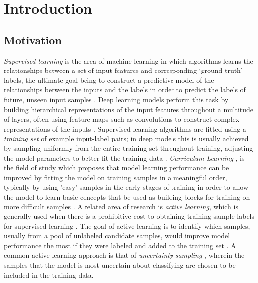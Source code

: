 \chapter{Introduction}

\section{Motivation}\label{sec:Intro_Motivation}

\textit{Supervised learning} is the area of machine learning in which algorithms learns the relationships between a set of input features and corresponding `ground truth' labels, the ultimate goal being to construct a predictive model of the relationships between the inputs and the labels in order to predict the labels of future, unseen input samples \cite{Witten2011}. Deep learning models perform this task by building hierarchical representations of the input features throughout a multitude of layers, often using feature maps such as convolutions to construct complex representations of the inputs \cite{lecun2015deep}. Supervised learning algorithms are fitted using a \textit{training set} of example input-label pairs; in deep models this is usually achieved by sampling uniformly from the entire training set throughout training, adjusting the model parameters to better fit the training data \cite{shamir2013stochastic}. \textit{Curriculum Learning} \cite{Bengio2009} \cite{louradour2014curriculum}, is the field of study which proposes that model learning performance can be improved by fitting the model on training samples in a meaningful order, typically by using 'easy' samples in the early stages of training in order to allow the model to learn basic concepts that be used as building blocks for training on more difficult samples \cite{ELMAN199371}. A related area of research is \textit{active learning}, which is generally used when there is a prohibitive cost to obtaining training sample labels for supervised learning \cite{settles2012active}. The goal of active learning is to identify which samples, usually from a pool of unlabeled candidate samples, would improve model performance the most if they were labeled and added to the training set \cite{settles2012active}. A common active learning approach is that of \textit{uncertainty sampling} \cite{settles2012active}, wherein the samples that the model is most uncertain about classifying are chosen to be included in the training data.

